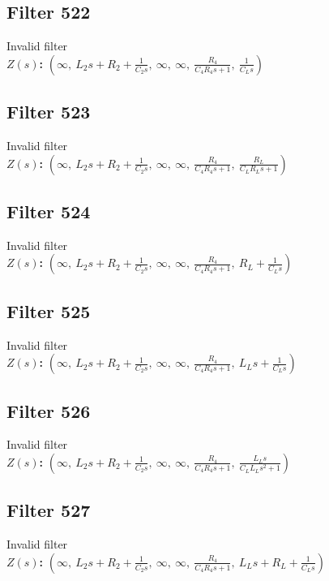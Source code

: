 \documentclass{article}
\begin{document}
\subsection*{Filter 522}
Invalid filter \\ 
\textbf{$Z(s)$:} $\left( \infty, \  L_{2} s + R_{2} + \frac{1}{C_{2} s}, \  \infty, \  \infty, \  \frac{R_{4}}{C_{4} R_{4} s + 1}, \  \frac{1}{C_{L} s}\right)$ \\ 
\subsection*{Filter 523}
Invalid filter \\ 
\textbf{$Z(s)$:} $\left( \infty, \  L_{2} s + R_{2} + \frac{1}{C_{2} s}, \  \infty, \  \infty, \  \frac{R_{4}}{C_{4} R_{4} s + 1}, \  \frac{R_{L}}{C_{L} R_{L} s + 1}\right)$ \\ 
\subsection*{Filter 524}
Invalid filter \\ 
\textbf{$Z(s)$:} $\left( \infty, \  L_{2} s + R_{2} + \frac{1}{C_{2} s}, \  \infty, \  \infty, \  \frac{R_{4}}{C_{4} R_{4} s + 1}, \  R_{L} + \frac{1}{C_{L} s}\right)$ \\ 
\subsection*{Filter 525}
Invalid filter \\ 
\textbf{$Z(s)$:} $\left( \infty, \  L_{2} s + R_{2} + \frac{1}{C_{2} s}, \  \infty, \  \infty, \  \frac{R_{4}}{C_{4} R_{4} s + 1}, \  L_{L} s + \frac{1}{C_{L} s}\right)$ \\ 
\subsection*{Filter 526}
Invalid filter \\ 
\textbf{$Z(s)$:} $\left( \infty, \  L_{2} s + R_{2} + \frac{1}{C_{2} s}, \  \infty, \  \infty, \  \frac{R_{4}}{C_{4} R_{4} s + 1}, \  \frac{L_{L} s}{C_{L} L_{L} s^{2} + 1}\right)$ \\ 
\subsection*{Filter 527}
Invalid filter \\ 
\textbf{$Z(s)$:} $\left( \infty, \  L_{2} s + R_{2} + \frac{1}{C_{2} s}, \  \infty, \  \infty, \  \frac{R_{4}}{C_{4} R_{4} s + 1}, \  L_{L} s + R_{L} + \frac{1}{C_{L} s}\right)$ \\ 
\end{document}
